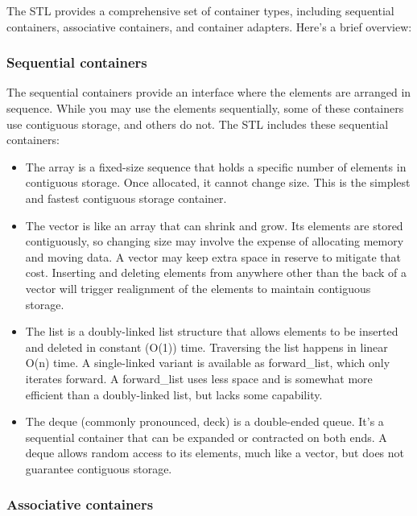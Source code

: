 
The STL provides a comprehensive set of container types, including sequential containers, associative containers, and container adapters. Here's a brief overview:

\subsubsection{Sequential containers}


The sequential containers provide an interface where the elements are arranged in sequence. While you may use the elements sequentially, some of these containers use contiguous storage, and others do not. The STL includes these sequential containers:

\begin{itemize}
\item 
The array is a fixed-size sequence that holds a specific number of elements in contiguous storage. Once allocated, it cannot change size. This is the simplest and fastest contiguous storage container.

\item 
The vector is like an array that can shrink and grow. Its elements are stored contiguously, so changing size may involve the expense of allocating memory and moving data. A vector may keep extra space in reserve to mitigate that cost. Inserting and deleting elements from anywhere other than the back of a vector will trigger realignment of the elements to maintain contiguous storage.

\item 
The list is a doubly-linked list structure that allows elements to be inserted and deleted in constant (O(1)) time. Traversing the list happens in linear O(n) time. A single-linked variant is available as forward\_list, which only iterates forward. A forward\_list uses less space and is somewhat more efficient than a doubly-linked list, but lacks some capability.

\item 
The deque (commonly pronounced, deck) is a double-ended queue. It's a sequential container that can be expanded or contracted on both ends. A deque allows random access to its elements, much like a vector, but does not guarantee contiguous storage.
\end{itemize}

\subsubsection{Associative containers}

